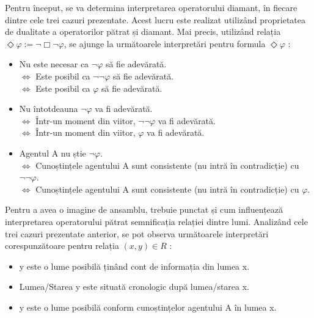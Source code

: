 \documentclass[12pt, openany]{book}
\begin{document}
            \par{}
                Pentru început, se va determina interpretarea operatorului diamant, în fiecare dintre cele trei cazuri prezentate.
                Acest lucru este realizat utilizând proprietatea de dualitate a operatorilor pătrat și diamant. Mai precis,
                utilizând relația $\Diamond\varphi := \neg\Box\neg\varphi$, se ajunge la următoarele interpretări 
                pentru formula $\Diamond\varphi$ \cite{lecture_notes_hedin}:
                \begin{itemize}[itemsep=3pt]
                    \item Nu este necesar ca $\neg\varphi$ să fie adevărată. \\
                        $\Leftrightarrow$ Este posibil ca $\neg\neg\varphi$ să fie adevărată. \\
                        $\Leftrightarrow$ Este posibil ca $\varphi$ să fie adevărată.
                    \item Nu întotdeauna $\neg\varphi$ va fi adevărată. \\
                        $\Leftrightarrow$ Într-un moment din viitor, $\neg\neg\varphi$ va fi adevărată. \\
                        $\Leftrightarrow$ Într-un moment din viitor, $\varphi$ va fi adevărată.
                    \item Agentul A nu știe $\neg\varphi$. \\
                        $\Leftrightarrow$ Cunoștințele agentului A sunt consistente (nu intră în contradicție) cu $\neg\neg\varphi$. \\
                        $\Leftrightarrow$ Cunoștințele agentului A sunt consistente (nu intră în contradicție) cu $\varphi$.
                \end{itemize}
                \vspace{6pt}

            \par{}
                Pentru a avea o imagine de ansamblu, trebuie punctat și cum influențează interpretarea 
                operatorului pătrat semnificația relației dintre lumi. Analizând cele trei cazuri prezentate anterior,
                se pot observa următoarele interpretări corespunzătoare pentru relația $(x,y) \in R$ \cite{lecture_notes_hedin}:
                \begin{itemize}
                    \item y este o lume posibilă ținând cont de informația din lumea x.
                    \item Lumea/Starea y este situată cronologic după lumea/starea x.
                    \item y este o lume posibilă conform cunoștințelor agentului A în lumea x.
                \end{itemize}
\end{document}
